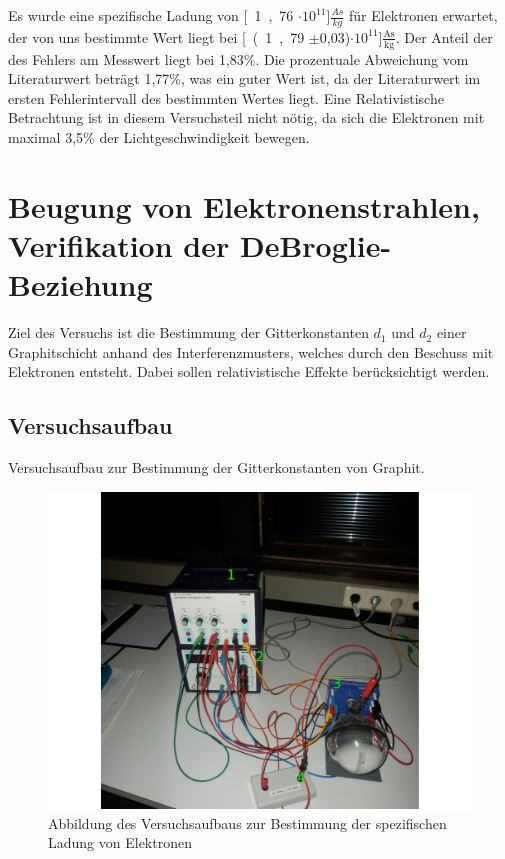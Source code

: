 \documentclass[12pt,a4paper]{article}
\begin{document}
Es wurde eine spezifische Ladung von \unit[1,76 $\cdot 10^{11}$]{$\frac{As}{kg}$} für Elektronen erwartet, der von uns bestimmte Wert liegt bei \unit[(1,79 $\pm$0,03)$\cdot 10^{11}$]{$\frac{\text{As}}{\text{kg}}$}. Der Anteil der des Fehlers am Messwert liegt bei 1,83\%. Die prozentuale Abweichung vom Literaturwert beträgt 1,77\%, was ein guter Wert ist, da der Literaturwert im ersten Fehlerintervall des bestimmten Wertes liegt. Eine Relativistische Betrachtung ist in diesem Versuchsteil nicht nötig, da sich die Elektronen mit maximal 3,5\% der Lichtgeschwindigkeit bewegen.

\section{Beugung von Elektronenstrahlen, Verifikation der DeBroglie-Beziehung}
Ziel des Versuchs ist die Bestimmung der Gitterkonstanten $d_1$ und $d_2$ einer Graphitschicht anhand des Interferenzmusters, welches durch den Beschuss mit Elektronen entsteht. Dabei sollen relativistische Effekte berücksichtigt werden.
\subsection{Versuchsaufbau}

Versuchsaufbau zur Bestimmung der Gitterkonstanten von Graphit.

\begin{figure}[H] 
  \centering
    \includegraphics[scale = 0.3]{aufbau_b.pdf}
  	\caption[Abbildung des Versuchsaufbaus zur Bestimmung der spezifischen Ladung von Elektronen]{Abbildung des Versuchsaufbaus zur Bestimmung der spezifischen Ladung von Elektronen}
  \label{fig:aufbau_h}
\end{figure}
\end{document}

